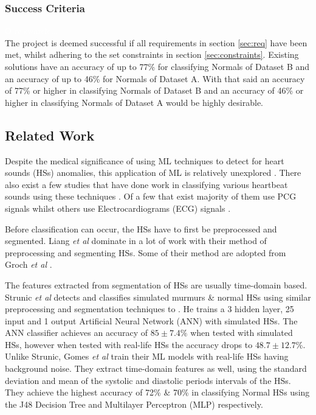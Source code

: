 \documentclass[10pt,twocolumn]{witseiepaper}
\begin{document}
\subsubsection{Success Criteria}
\textcolor{white}{O re swarele...}\\
The project is deemed successful if all requirements in section \ref{sec:req} have been met, whilst adhering to the set constraints in section \ref{sec:constraints}. Existing solutions
have an accuracy of up to 77\% for classifying Normals of Dataset B and an accuracy of up to 46\%
for Normals of Dataset A. With that said an accuracy of 77\% or higher in classifying Normals of Dataset B and
an accuracy of 46\% or higher in classifying Normals of Dataset A would be highly desirable.

\subsection{Related Work}
\label{sec:lit}
Despite the medical significance of using ML techniques to detect for heart sounds (HSs) anomalies, this application of ML is relatively unexplored \cite{bentley}. There also exist a few studies that have done work in classifying various heartbeat sounds using these techniques \cite{26}. Of a few that exist majority of them use PCG signals \cite{53,51,36,37} whilst others use Electrocardiograms (ECG) signals \cite{4,5}. 

Before classification can occur, the HSs have to first be preprocessed and segmented. Liang \textit{et al} \cite{6} dominate in a lot of work \cite{11,19,15,50} with their method of preprocessing and segmenting HSs. Some of their method are adopted from Groch \textit{et al} \cite{2}. 

The features extracted from segmentation of HSs are usually time-domain based. Strunic \textit{et al} \cite{3} detects and classifies simulated murmurs \& normal HSs using similar preprocessing and segmentation techniques to \cite{6}. He trains a 3 hidden layer, 25 input and 1 output Artificial Neural Network (ANN) with simulated HSs. The ANN classifier achieves an accuracy of $85\pm7.4\%$ when tested with simulated HSs, however when tested with real-life HSs the accuracy drops to $48.7\pm12.7\%$. Unlike Strunic, Gomes \textit{et al} \cite{gomes2012classifying} train their ML models with real-life HSs having background noise. They extract time-domain features as well, using the standard deviation and mean of the systolic and diastolic periods intervals of the HSs. They achieve the highest accuracy of 72\% \& 70\% in classifying Normal HSs using the J48 Decision Tree and Multilayer Perceptron (MLP) respectively.
\end{document}
